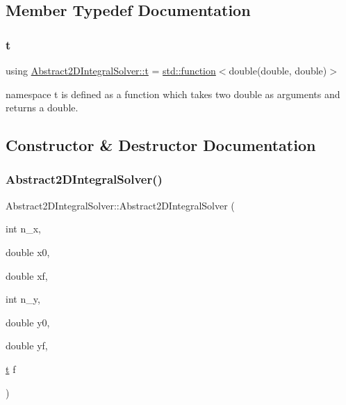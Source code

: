 \subsection{Member Typedef Documentation}
\mbox{\label{class_abstract2_d_integral_solver_ab660df32953c6b0f9f3a45a8720eaeb3}} 
\subsubsection{\texorpdfstring{t}{t}}
{\footnotesize\ttfamily using \hyperlink{class_abstract2_d_integral_solver_ab660df32953c6b0f9f3a45a8720eaeb3}{Abstract2\+D\+Integral\+Solver\+::t} =  \hyperlink{_tests_8cpp_a1c2dbde1ba7d93e381d4ccb9f603be16}{std\+::function}$<$double(double, double)$>$}

namespace t is defined as a function which takes two double as arguments and returns a double. 

\subsection{Constructor \& Destructor Documentation}
\mbox{\label{class_abstract2_d_integral_solver_ad25b34f07befbbad7d3ec2b76d47b2b7}} 
\subsubsection{\texorpdfstring{Abstract2\+D\+Integral\+Solver()}{Abstract2DIntegralSolver()}}
{\footnotesize\ttfamily Abstract2\+D\+Integral\+Solver\+::\+Abstract2\+D\+Integral\+Solver (\begin{DoxyParamCaption}\item[{int}]{n\+\_\+x,  }\item[{double}]{x0,  }\item[{double}]{xf,  }\item[{int}]{n\+\_\+y,  }\item[{double}]{y0,  }\item[{double}]{yf,  }\item[{\hyperlink{class_abstract2_d_integral_solver_ab660df32953c6b0f9f3a45a8720eaeb3}{t}}]{f }\end{DoxyParamCaption})}

